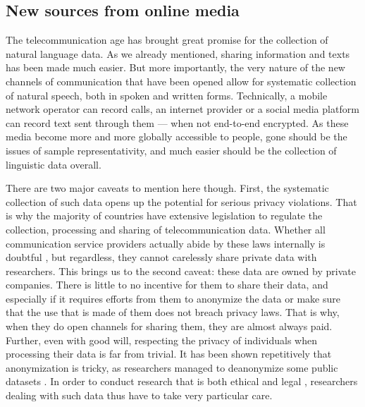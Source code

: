 \documentclass[../thesis.tex]{subfiles}
\begin{document}
\subsection{New sources from online media}
The telecommunication age has brought great promise for the collection of natural
language data. As we already mentioned, sharing information and texts has been made much
easier. But more importantly, the very nature of the new channels of
communication that have been opened allow for systematic collection of natural speech,
both in spoken and written forms. Technically, a mobile network operator can record
calls, an internet provider or a social media platform can record text sent through them
--- when not end-to-end encrypted. As these media become more and more globally
accessible to people, gone should be the issues of sample representativity, and much
easier should be the collection of linguistic data overall.

There are two major caveats to mention here though. First, the systematic collection of
such data opens up the potential for serious privacy violations. That is why the
majority of countries have extensive legislation to regulate the collection, processing
and sharing of telecommunication data. Whether all communication service providers
actually abide by these laws internally is doubtful
\cite{GDPREnforcement,GDPRFines2023}, but regardless, they cannot carelessly share
private data with researchers. This brings us to the second caveat: these data are owned
by private companies. There is little to no incentive for them to share their data, and
especially if it requires efforts from them to anonymize the data or make sure that the
use that is made of them does not breach privacy laws. That is why, when they do open
channels for sharing them, they are almost always paid. Further, even with good will,
respecting the privacy of individuals when processing their data is far from trivial. It
has been shown repetitively that anonymization is tricky, as researchers managed
to deanonymize some public datasets
\cite{NarayananRobustDeanonymization2008,GambsDeanonymizationAttack2014}. In order to
conduct research that is both ethical and legal
\cite{OhmBrokenPromises2009a,KulkBraveNew2012}, researchers dealing with such data thus
have to take very particular care.
\end{document}
